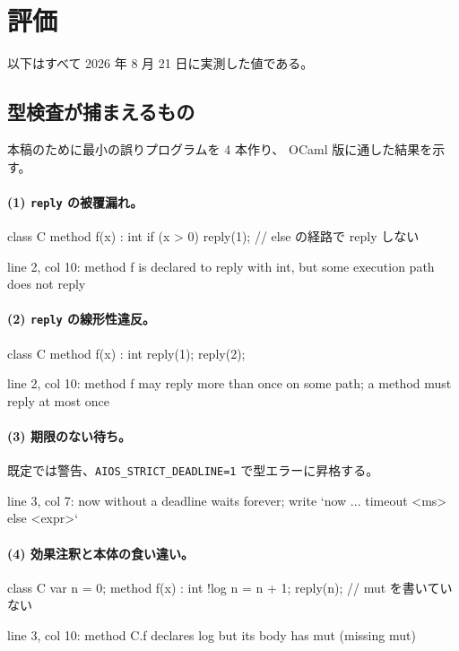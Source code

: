 \documentclass[11pt,a4paper]{ltjsarticle}
\theoremstyle{definition}
\theoremstyle{remark}
\begin{document}
\section{評価}
\label{sec:eval}

以下はすべて 2026 年 8 月 21 日に実測した値である。

\subsection{型検査が捕まえるもの}

本稿のために最小の誤りプログラムを 4 本作り、
OCaml 版に通した結果を示す。

\paragraph{(1) \texttt{reply} の被覆漏れ。}
\begin{aipl}
class C {
  method f(x) : int {
    if (x > 0) { reply(1); }        // else の経路で reply しない
  }
}
\end{aipl}
\begin{term}
 line 2, col 10: method f is declared to reply with int,
             but some execution path does not reply
\end{term}

\paragraph{(2) \texttt{reply} の線形性違反。}
\begin{aipl}
class C { method f(x) : int { reply(1); reply(2); } }
\end{aipl}
\begin{term}
 line 2, col 10: method f may reply more than once on some path;
             a method must reply at most once
\end{term}

\paragraph{(3) 期限のない待ち。}
既定では警告、\texttt{AIOS\_STRICT\_DEADLINE=1} で型エラーに昇格する。
\begin{term}
 line 3, col 7: now without a deadline waits forever;
             write `now ... timeout <ms> else <expr>`
\end{term}

\paragraph{(4) 効果注釈と本体の食い違い。}
\begin{aipl}
class C {
  var n = 0;
  method f(x) : int !{log} { n = n + 1; reply(n); }   // mut を書いていない
}
\end{aipl}
\begin{term}
 line 3, col 10: method C.f declares {log} but its body has {mut}
             (missing {mut})
\end{term}
\end{document}
